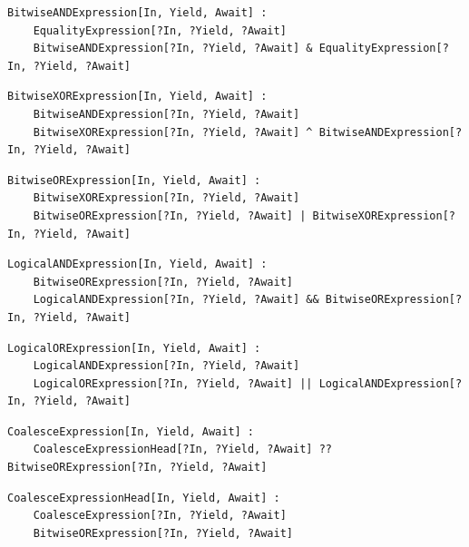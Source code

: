 \noindent\textbf{\texttt{}}\par
\begin{lstlisting}
BitwiseANDExpression[In, Yield, Await] :
    EqualityExpression[?In, ?Yield, ?Await]
    BitwiseANDExpression[?In, ?Yield, ?Await] & EqualityExpression[?In, ?Yield, ?Await]
\end{lstlisting}

\noindent\textbf{\texttt{}}\par
\begin{lstlisting}
BitwiseXORExpression[In, Yield, Await] :
    BitwiseANDExpression[?In, ?Yield, ?Await]
    BitwiseXORExpression[?In, ?Yield, ?Await] ^ BitwiseANDExpression[?In, ?Yield, ?Await]
\end{lstlisting}

\noindent\textbf{\texttt{}}\par
\begin{lstlisting}
BitwiseORExpression[In, Yield, Await] :
    BitwiseXORExpression[?In, ?Yield, ?Await]
    BitwiseORExpression[?In, ?Yield, ?Await] | BitwiseXORExpression[?In, ?Yield, ?Await]
\end{lstlisting}

\noindent\textbf{\texttt{}}\par
\begin{lstlisting}
LogicalANDExpression[In, Yield, Await] :
    BitwiseORExpression[?In, ?Yield, ?Await]
    LogicalANDExpression[?In, ?Yield, ?Await] && BitwiseORExpression[?In, ?Yield, ?Await]
\end{lstlisting}

\noindent\textbf{\texttt{}}\par
\begin{lstlisting}
LogicalORExpression[In, Yield, Await] :
    LogicalANDExpression[?In, ?Yield, ?Await]
    LogicalORExpression[?In, ?Yield, ?Await] || LogicalANDExpression[?In, ?Yield, ?Await]
\end{lstlisting}

\noindent\textbf{\texttt{}}\par
\begin{lstlisting}
CoalesceExpression[In, Yield, Await] :
    CoalesceExpressionHead[?In, ?Yield, ?Await] ?? BitwiseORExpression[?In, ?Yield, ?Await]
\end{lstlisting}

\noindent\textbf{\texttt{}}\par
\begin{lstlisting}
CoalesceExpressionHead[In, Yield, Await] :
    CoalesceExpression[?In, ?Yield, ?Await]
    BitwiseORExpression[?In, ?Yield, ?Await]
\end{lstlisting}


